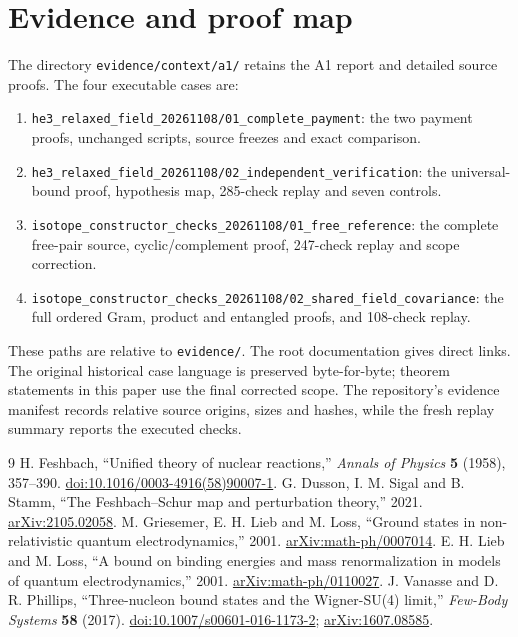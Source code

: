 \documentclass[11pt]{article}
\theoremstyle{definition}
\begin{document}
\section{Evidence and proof map}\label{app:map}

The directory \texttt{evidence/context/a1/} retains the A1 report and detailed source proofs. The four executable cases are:
\begin{enumerate}\raggedright
 \item \texttt{he3\_relaxed\_field\_20261108/01\_complete\_payment}: the two payment proofs, unchanged scripts, source freezes and exact comparison.
 \item \texttt{he3\_relaxed\_field\_20261108/02\_independent\_verification}: the universal-bound proof, hypothesis map, 285-check replay and seven controls.
 \item \texttt{isotope\_constructor\_checks\_20261108/01\_free\_reference}: the complete free-pair source, cyclic/complement proof, 247-check replay and scope correction.
 \item \texttt{isotope\_constructor\_checks\_20261108/02\_shared\_field\_covariance}: the full ordered Gram, product and entangled proofs, and 108-check replay.
\end{enumerate}
These paths are relative to \texttt{evidence/}. The root documentation gives direct links. The original historical case language is preserved byte-for-byte; theorem statements in this paper use the final corrected scope. The repository's evidence manifest records relative source origins, sizes and hashes, while the fresh replay summary reports the executed checks.

\begin{thebibliography}{9}
 H. Feshbach, ``Unified theory of nuclear reactions,'' \emph{Annals of Physics} \textbf{5} (1958), 357--390. \href{https://doi.org/10.1016/0003-4916(58)90007-1}{doi:10.1016/0003-4916(58)90007-1}.
 G. Dusson, I. M. Sigal and B. Stamm, ``The Feshbach--Schur map and perturbation theory,'' 2021. \href{https://arxiv.org/abs/2105.02058}{arXiv:2105.02058}.
 M. Griesemer, E. H. Lieb and M. Loss, ``Ground states in non-relativistic quantum electrodynamics,'' 2001. \href{https://arxiv.org/abs/math-ph/0007014}{arXiv:math-ph/0007014}.
 E. H. Lieb and M. Loss, ``A bound on binding energies and mass renormalization in models of quantum electrodynamics,'' 2001. \href{https://arxiv.org/abs/math-ph/0110027}{arXiv:math-ph/0110027}.
 J. Vanasse and D. R. Phillips, ``Three-nucleon bound states and the Wigner-SU(4) limit,'' \emph{Few-Body Systems} \textbf{58} (2017). \href{https://doi.org/10.1007/s00601-016-1173-2}{doi:10.1007/s00601-016-1173-2}; \href{https://arxiv.org/abs/1607.08585}{arXiv:1607.08585}.
\end{thebibliography}
\end{document}
